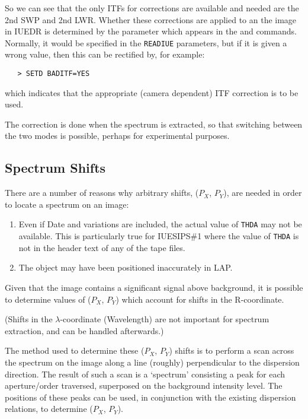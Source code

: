 So we can see that the only ITFs for corrections are available and needed
are the 2nd SWP and 2nd LWR. Whether these corrections are applied to an
the image in IUEDR is determined by the 
parameter which appears in the  and
 commands.  Normally, it would be
specified in the \verb+READIUE+ parameters, but if it is given a wrong value,
then this can be rectified by, for example:

\begin{verbatim}
   > SETD BADITF=YES
\end{verbatim}

which indicates that the appropriate (camera dependent) ITF correction is to be
used.

The correction is done when the spectrum is extracted, so that switching
between the two modes is possible, perhaps for experimental purposes.


\subsection{Spectrum Shifts}

There are a number of reasons why arbitrary shifts, ($P_{X}$, $P_{Y}$), are
needed in order to locate a spectrum on an image:

\begin{enumerate}

\item Even if Date and 
 variations are included, the actual value
      of \verb+THDA+ may not be available.  This is particularly true for
      IUESIPS\#1 where the value of \verb+THDA+ is not in the header text of
      any of the tape files.

\item The object may have been positioned inaccurately in LAP\@.

\end{enumerate}

Given that the image contains a significant signal above background, it is
possible to determine values of ($P_{X}$, $P_{Y}$) which account for shifts in
the R-coordinate.

(Shifts in the $\lambda$-coordinate (Wavelength) are not important for spectrum
extraction, and can be handled afterwards.\@)

The method used to determine these ($P_{X}$, $P_{Y}$) shifts is to perform a
scan across the spectrum on the image along a line (roughly) perpendicular to
the dispersion direction.  The result of such a scan is a `spectrum'
consisting a peak for each aperture/order traversed, superposed on the
background intensity level.  The positions of these peaks can be used, in
conjunction with the existing dispersion relations, to determine ($P_{X}$,
$P_{Y}$)\@.

